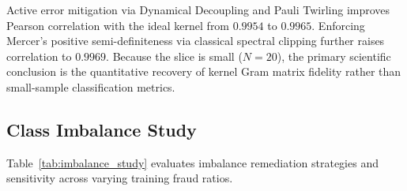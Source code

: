 \documentclass[12pt,a4paper]{article}
\begin{document}
\begin{table}[ht]
\centering
\small
\caption{Setting D Hardware execution metrics and error mitigation recovery.}
\label{tab:hardware_results}
\end{table}

Active error mitigation via Dynamical Decoupling and Pauli Twirling improves Pearson correlation with the ideal kernel from $0.9954$ to $0.9965$. Enforcing Mercer's positive semi-definiteness via classical spectral clipping further raises correlation to $0.9969$. Because the slice is small ($N=20$), the primary scientific conclusion is the quantitative recovery of kernel Gram matrix fidelity rather than small-sample classification metrics.

\subsection{Class Imbalance Study}

Table~\ref{tab:imbalance_study} evaluates imbalance remediation strategies and sensitivity across varying training fraud ratios.
\end{document}
